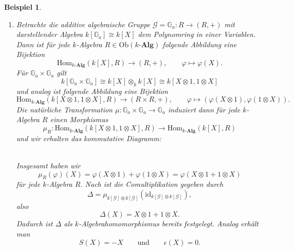 \documentclass[a4paper, 11pt]{scrartcl}
\newcommand{\Hom}{\text{Hom}}
\newcommand{\id}{\text{id}}
\newcommand{\Ob}{\text{Ob}}
\theoremstyle{basicstyle}
\newtheorem{beispiel}[definition]{Beispiel}
\begin{document}
    \begin{beispiel}
        \begin{enumerate}
            \item Betrachte die additive algebraische Gruppe \(\mathcal{G} = \mathbb{G}_a : R \longrightarrow (R, +)\) mit darstellender Algebra \(k[\mathbb{G}_a] \cong k[X]\) dem Polynomring in einer Variablen.
                Dann ist für jede \(k\)-Algebra \(R \in \Ob(k\textbf{-Alg})\) folgende Abbildung eine Bijektion
                \[\Hom_{k\textbf{-Alg}}(k[X], R) \longrightarrow (R, +), \qquad \varphi \mapsto \varphi(X).\]
                Für \(\mathbb{G}_a \times \mathbb{G}_a\) gilt
                \[k[\mathbb{G}_a \times \mathbb{G}_a] \cong k[X] \otimes_k k[X] \cong k[X \otimes 1, 1 \otimes X]\]
                und analog ist folgende Abbildung eine Bijektion
                \[\Hom_{k\textbf{-Alg}}(k[X \otimes 1, 1 \otimes X], R) \longrightarrow (R \times R, +), \qquad \varphi \mapsto (\varphi(X \otimes 1), \varphi(1 \otimes X)).\]
                Die natürliche Transformation \(\mu: \mathbb{G}_a \times \mathbb{G}_a \to \mathbb{G}_a\) induziert dann für jede \(k\)-Algebra \(R\) einen Morphismus
                \[\mu_R : \Hom_{k\textbf{-Alg}}(k[X \otimes 1, 1 \otimes X], R) \longrightarrow \Hom_{k\textbf{-Alg}}(k[X], R)\]
                und wir erhalten das kommutative Diagramm: 
                \begin{figure*}[ht!]
                    \centering
                \end{figure*} \\
                Insgesamt haben wir \[\mu_R(\varphi)(X) = \varphi(X \otimes 1) + \varphi(1 \otimes X) = \varphi(X \otimes 1 + 1 \otimes X)\]
                für jede \(k\)-Algebra \(R\).
                Nach  ist die Comultiplikation gegeben durch
                \[\Delta = \mu_{k[\mathcal{G}] \otimes k[\mathcal{G}]}(\id_{k[\mathcal{G}] \otimes k[\mathcal{G}]}),\]
                also \[\Delta(X) = X \otimes 1 + 1 \otimes X.\]
                Dadurch ist \(\Delta\) als \(k\)-Algebrahomomorphismus bereits festgelegt.
                Analog erhält man \[S(X) = -X \qquad\text{und}\qquad \epsilon(X) = 0.\]


\end{enumerate}
\end{beispiel}
\end{document}
